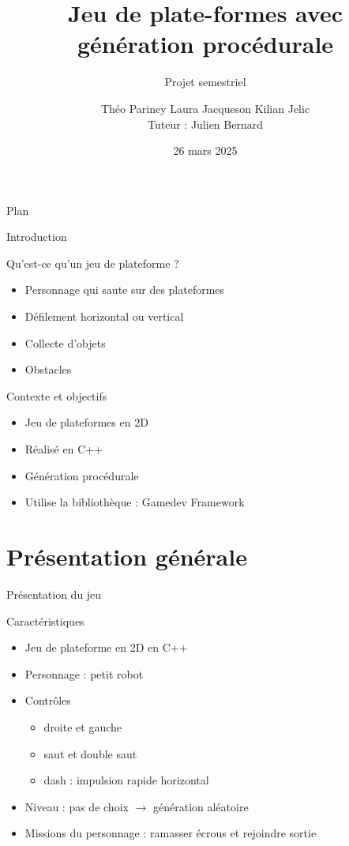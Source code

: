 \documentclass{beamer}
\title{Jeu de plate-formes avec génération procédurale}
\subtitle{Projet semestriel}
\author[T.Pariney L.Jaqueson K.Jelic]{Théo Pariney \newline Laura Jacqueson \newline Kilian Jelic\\\footnotesize Tuteur : Julien Bernard}
\institute[]{Université Marie et Louis Pasteur \\ \vspace{0.25cm} Licence 3 Informatique, 2024--2025}
\date{26 mars 2025}
\newcommand{\nologo}{\setbeamertemplate{logo}{}}
\begin{document}
\begin{frame}
    \titlepage
\end{frame}

{\nologo

\begin{frame}{Plan}
    \tableofcontents
\end{frame}

\begin{frame}{Introduction}
    \begin{block}{Qu'est-ce qu'un jeu de plateforme ?}
       \begin{itemize}
            \item[\bullet] Personnage qui saute sur des plateformes
            \item[\bullet] Défilement horizontal ou vertical
            \item[\bullet] Collecte d'objets
            \item[\bullet] Obstacles
        \end{itemize}
    \end{block}
    \begin{block}{Contexte et objectifs}
        \begin{itemize}
            \item[\bullet] Jeu de plateformes en 2D
            \item[\bullet] Réalisé en C++
            \item[\bullet] Génération procédurale
            \item[\bullet] Utilise la bibliothèque : Gamedev Framework
        \end{itemize}
    \end{block}
\end{frame}

\section{Présentation générale}
\begin{frame}{Présentation du jeu}
    \begin{block}{Caractéristiques}
        \begin{itemize}
            \item[\bullet] Jeu de plateforme en 2D en C++
            \item[\bullet] Personnage : petit robot
            \item[\bullet] Contrôles
            \begin{itemize}
                \item droite et gauche
                \item saut et double saut
                \item dash : impulsion rapide horizontal
            \end{itemize}
            \item[\bullet] Niveau : pas de choix $\rightarrow$ génération aléatoire
            \item[\bullet] Missions du personnage : ramasser écrous et rejoindre sortie
        \end{itemize}
    \end{block}
\end{frame}

}
\end{document}
